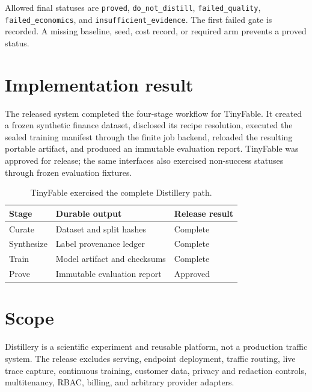 \documentclass{article}
\begin{document}
Allowed final statuses are \texttt{proved}, \texttt{do\_not\_distill}, \texttt{failed\_quality}, \texttt{failed\_economics}, and \texttt{insufficient\_evidence}. The first failed gate is recorded. A missing baseline, seed, cost record, or required arm prevents a proved status.

\section{Implementation result}
The released system completed the four-stage workflow for TinyFable. It created a frozen synthetic finance dataset, disclosed its recipe resolution, executed the sealed training manifest through the finite job backend, reloaded the resulting portable artifact, and produced an immutable evaluation report. TinyFable was approved for release; the same interfaces also exercised non-success statuses through frozen evaluation fixtures.

\begin{table}[h]
\centering
\begin{tabular}{lll}
\toprule
Stage & Durable output & Release result \\
\midrule
Curate & Dataset and split hashes & Complete \\
Synthesize & Label provenance ledger & Complete \\
Train & Model artifact and checksums & Complete \\
Prove & Immutable evaluation report & Approved \\
\bottomrule
\end{tabular}
\caption{TinyFable exercised the complete Distillery path.}
\end{table}

\section{Scope}
Distillery is a scientific experiment and reusable platform, not a production traffic system. The release excludes serving, endpoint deployment, traffic routing, live trace capture, continuous training, customer data, privacy and redaction controls, multitenancy, RBAC, billing, and arbitrary provider adapters.
\end{document}
